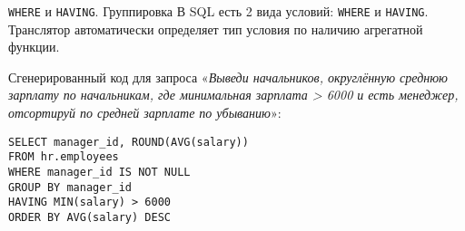 \begin{frame}[fragile]{\texttt{WHERE} и \texttt{HAVING}. Группировка}%
  В SQL есть 2 вида условий: \texttt{WHERE} и \texttt{HAVING}.
  Транслятор автоматически определяет тип условия по наличию агрегатной функции.

  Сгенерированный код для запроса «\textit{Выведи начальников, округлённую среднюю зарплату по начальникам, где минимальная зарплата > 6000 и есть менеджер, отсортируй по средней зарплате по убыванию}»:

  \begin{verbatim}
SELECT manager_id, ROUND(AVG(salary))
FROM hr.employees
WHERE manager_id IS NOT NULL
GROUP BY manager_id
HAVING MIN(salary) > 6000
ORDER BY AVG(salary) DESC
  \end{verbatim}

\end{frame}
